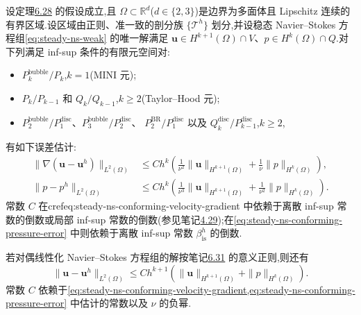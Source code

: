 \begin{corollary}[协调有限元空间对的误差估计]\label{cor:steady-ns-conforming-fem-error}
设定理\hyperref[thm:steady-ns-fem-error-gradient]{6.28} 的假设成立,且 $\Omega\subset\mathbb{R}^d$($d\in\{2,3\}$)是边界为多面体且 Lipschitz 连续的有界区域.设区域由正则、准一致的剖分族 $\{\mathcal{T}^h\}$ 划分,并设稳态 Navier--Stokes 方程组\cref{eq:steady-ns-weak} 的唯一解满足 $\bm{u}\in H^{k+1}(\Omega)\cap V$、$p\in H^k(\Omega)\cap Q$.对下列满足 inf-sup 条件的有限元空间对:
\begin{itemize}
  \item $P_k^{\mathrm{bubble}}/P_k$,$k=1$(MINI 元);
  \item $P_k/P_{k-1}$ 和 $Q_k/Q_{k-1}$,$k\ge2$(Taylor--Hood 元);
  \item $P_2^{\mathrm{bubble}}/P_1^{\mathrm{disc}}$、$P_3^{\mathrm{bubble}}/P_2^{\mathrm{disc}}$、
        $P_2^{\mathrm{BR}}/P_1^{\mathrm{disc}}$ 以及 $Q_k^{\mathrm{disc}}/P_{k-1}^{\mathrm{disc}}$,$k\ge2$,
\end{itemize}
有如下误差估计:
\begin{align}
  \|\nabla(\bm{u}-\bm{u}^h)\|_{L^2(\Omega)}
   &\le Ch^k\left(
       \frac1{\nu^2}\|\bm{u}\|_{H^{k+1}(\Omega)}
       +\frac1\nu\|p\|_{H^k(\Omega)}\right),
       \label{eq:steady-ns-conforming-velocity-gradient}\\
  \|p-p^h\|_{L^2(\Omega)}
   &\le Ch^k\left(
       \frac1{\nu^3}\|\bm{u}\|_{H^{k+1}(\Omega)}
       +\frac1{\nu^2}\|p\|_{H^k(\Omega)}\right).
       \label{eq:steady-ns-conforming-pressure-error}
\end{align}
常数 $C$ 在cref{eq:steady-ns-conforming-velocity-gradient} 中依赖于离散 inf-sup 常数的倒数或局部 inf-sup 常数的倒数(参见笔记\hyperref[note:stokes-error-infsup-dependency]{4.29});在\cref{eq:steady-ns-conforming-pressure-error} 中则依赖于离散 inf-sup 常数 $\beta_{\mathrm{is}}^h$ 的倒数.

若对偶线性化 Navier--Stokes 方程组的解按笔记\hyperref[note:steady-ns-dual-linearized-problem]{6.31} 的意义正则,则还有
\begin{equation}\label{eq:steady-ns-conforming-velocity-l2-error}
  \|\bm{u}-\bm{u}^h\|_{L^2(\Omega)}
    \le Ch^{k+1}\left(
       \|\bm{u}\|_{H^{k+1}(\Omega)}
       +\|p\|_{H^k(\Omega)}\right).
\end{equation}
常数 $C$ 依赖于\cref{eq:steady-ns-conforming-velocity-gradient,eq:steady-ns-conforming-pressure-error} 中估计的常数以及 $\nu$ 的负幂.
\end{corollary}

